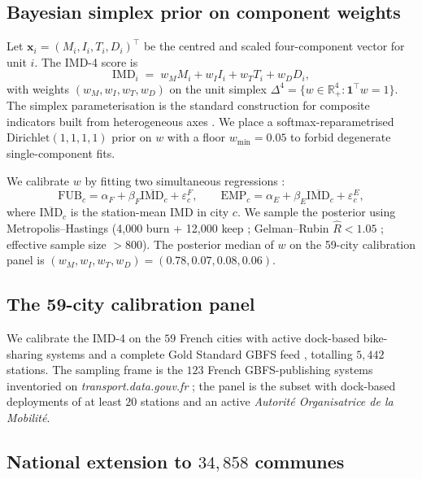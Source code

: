\documentclass[11pt,a4paper]{article}
\newcommand{\IMD}{\mathrm{IMD}}
\begin{document}
\subsection{Bayesian simplex prior on component weights}
\label{sec:bayes}

Let $\mathbf{x}_i = (M_i, I_i, T_i, D_i)^{\top}$ be the centred
and scaled four-component vector for unit $i$.  The IMD-4 score is
\[
    \IMD_i \;=\; w_M M_i + w_I I_i + w_T T_i + w_D D_i,
\]
with weights $(w_M, w_I, w_T, w_D)$ on the unit simplex
$\Delta^4 = \{w \in \mathbb{R}_+^4 : \mathbf{1}^{\top} w = 1\}$.
The simplex parameterisation is the standard construction for
composite indicators built from heterogeneous axes
\citep{OECD2008,Saisana2005}.  We place a softmax-reparametrised
$\text{Dirichlet}(1,1,1,1)$ prior on $w$ with a floor
$w_{\min} = 0.05$ to forbid degenerate single-component fits.

We calibrate $w$ by fitting two simultaneous regressions :
\[
    \text{FUB}_c = \alpha_F + \beta_F \overline{\IMD}_c + \varepsilon^F_c,
    \qquad
    \text{EMP}_c = \alpha_E + \beta_E \overline{\IMD}_c + \varepsilon^E_c,
\]
where $\overline{\IMD}_c$ is the station-mean IMD in city $c$.
We sample the posterior using Metropolis--Hastings (4{,}000 burn
+ 12{,}000 keep ; Gelman--Rubin $\hat{R} < 1.05$ ; effective
sample size $> 800$).  The posterior median of $w$ on the
59-city calibration panel is
$(w_M, w_I, w_T, w_D) = (0.78, 0.07, 0.08, 0.06)$.

\subsection{The 59-city calibration panel}
\label{sec:calib}

We calibrate the IMD-4 on the $59$ French cities with active
dock-based bike-sharing systems and a complete Gold Standard
GBFS feed \citep{Fosse2026gold}, totalling $5{,}442$ stations.
The sampling frame is the $123$ French GBFS-publishing systems
inventoried on \emph{transport.data.gouv.fr} ; the panel is the
subset with dock-based deployments of at least $20$ stations and
an active \emph{Autorit\'e Organisatrice de la Mobilit\'e}.

\subsection{National extension to $34{,}858$ communes}
\label{sec:national-imd}
\end{document}
